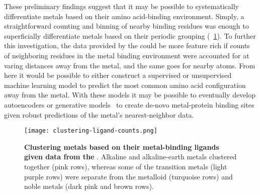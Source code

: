 \documentclass[../main/main]{subfiles}
\begin{document}
These preliminary findings suggest that it may be possible to systematically differentiate metals based on their amino acid-binding environment. Simply, a straightforward counting and binning of nearby binding residues was enough to superficially differentiate metals based on their periodic grouping (\FIGURE~\ref{\figname{C}{6}}). To further this investigation, the data provided by the \mPDB{} could be more feature rich if counts of neighboring residues in the metal binding environment were accounted for at varing distances away from the metal, and the same goes for nearby atoms. From here it would be possible to either construct a supervised or unsupervised machine learning model to predict the most common amino acid configuration away from the metal. With these models it may be possible to eventually develop autoencoders or generative models~\cite{goodfellow2014generative} to create de-novo metal-protein binding sites given robust predictions of the metal's nearest-neighbor data.
\clearpage %

\begin{figure}[H]
	\centering
	\texttt{[image: clustering-ligand-counts.png]}
	\caption[Clustering metals based on their metal-binding ligands given data from the \mPDB{}]
	{
		\textbf{Clustering metals based on their metal-binding ligands given data from the \mPDB{}}.
		Alkaline and alkaline-earth metals clustered together (pink rows), whereas some of the transition metals (light purple rows) were separate from the metalloid (turquoise rows) and noble metals (dark pink and brown rows).
	}
	\label{\figname{C}{6}}
\end{figure}
\clearpage %

% 		
% 		
\end{document}
